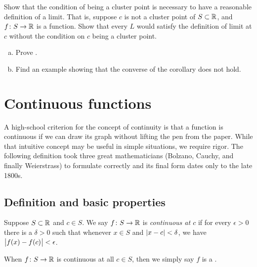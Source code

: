 \begin{exercise}
Show that the condition of being a cluster point is necessary to have a
reasonable definition of a limit.  That is, suppose $c$ is not a cluster
point of $S \subset {\mathbb{R}}$, and $f \colon S \to {\mathbb{R}}$ is a function.  Show that
every $L$ would satisfy the definition of limit at $c$ without the condition
on $c$ being a cluster point.
\end{exercise}

\begin{exercise}
\leavevmode
\begin{enumerate}[a)]
\item
Prove .
\item
Find an example showing that the converse of
the corollary does not hold.
\end{enumerate}
\end{exercise}


\sectionnewpage
\section{Continuous functions}
\label{sec:cont}



A high-school criterion for the concept of continuity
is that a function is continuous if
we can draw its graph without lifting the pen from the paper.  While that
intuitive concept may be useful in simple situations, we require
rigor.  The following definition took three great mathematicians
(Bolzano, Cauchy, and finally Weierstrass) to formulate correctly and its final
form dates only to the late 1800s.

\subsection{Definition and basic properties}

\begin{defn}
Suppose $S \subset {\mathbb{R}}$ and $c \in S$.
We say $f \colon S \to {\mathbb{R}}$
is \emph{continuous at $c$}
if for every $\epsilon > 0$
there is a $\delta > 0$ such that whenever $x \in S$ and $\sabs{x-c} <
\delta$, we have
$\bigl\lvert {f(x)-f(c)} \bigr\rvert < \epsilon$.


When $f \colon S \to {\mathbb{R}}$ is continuous at all $c \in S$, then we simply say
$f$ is a \emph{}.
\end{defn}
\begin{myfigureht}
\caption{For $\sabs{x-c} < \delta$, the graph of $f(x)$ should be within the gray region.\label{fig:contigr}}
\end{myfigureht}

